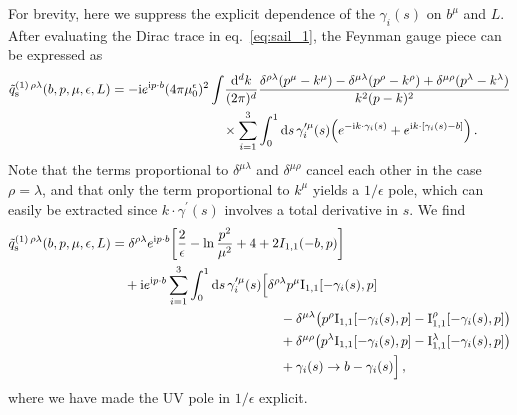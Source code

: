 \documentclass[11pt,a4paper]{article}
\DeclareRobustCommand{\eq}[1]{eq.~\eqref{eq:#1}}
\newcommand{\df}{\mathrm{d}}
\newcommand{\img}{\mathrm{i}}
\newcommand{\eps}{\epsilon}
\newcommand{\nn}{\nonumber}
\newcommand{\pb}{{p{\cdot}b}}
\newcommand{\MI}{\mathbf{\rm I}}
\begin{document}
For brevity, here we suppress the explicit dependence of the $\gamma_i(s)$ on $b^\mu$ and $L$.
After evaluating the Dirac trace in \eq{sail_1}, the Feynman gauge piece can be expressed as
\begin{align} \label{eq:sail_Feynman_2}
 \tilde q^{(1)\,\rho\lambda}_{\rm s}(b,p,\mu,\eps,L) &
 = -\img e^{\img \pb} (4\pi\mu_0^\eps)^2 \int\!\frac{\df^d k}{(2\pi)^d}
   \frac{\delta^{\rho\lambda} (p^\mu-k^\mu) - \delta^{\mu\lambda} (p^\rho-k^\rho) + \delta^{\mu\rho} (p^\lambda-k^\lambda)}{k^2 (p-k)^2}
   \nn\\&\hspace{3.cm}\times
   \sum_{i=1}^3 \int_0^1 \df s \, \gamma_i^{\prime \mu}(s) \Bigl( e^{- \img k \cdot \gamma_i(s)} + e^{\img k \cdot [\gamma_i(s) - b]} \Bigr)
\,.\end{align}
Note that the terms proportional to $\delta^{\mu\lambda}$ and $\delta^{\mu\rho}$ cancel each other in the case $\rho=\lambda$,
and that only the term proportional to $k^\mu$ yields a 
$1/\epsilon$ pole, which can easily be extracted since $k \cdot \gamma^\prime(s)$ involves
a total derivative in $s$. We find
\begin{align} \label{eq:sail_final}
 \tilde q^{(1)\,\rho\lambda}_{\rm s}(b,p,\mu,\eps,L) &
 = \delta^{\rho\lambda} e^{\img \pb} \biggl[ \frac{2}{\eps} - \ln\frac{p^2}{\mu^2} + 4 + 2 I_{1,1}(-b,p) \biggr]
 \nn\\&\quad
 + \img e^{\img \pb} \sum_{i=1}^3 \int_0^1 \df s \, \gamma_i^{\prime \mu}(s)
   \Bigl[ \delta^{\rho\lambda} p^\mu \MI_{1,1}[-\gamma_i(s), p]
        \nn\\&\hspace{4.5cm}
        - \delta^{\mu\lambda} \bigl( p^\rho \MI_{1,1}[-\gamma_i(s), p] - \MI_{1,1}^\rho[-\gamma_i(s), p] \bigr)
        \nn\\&\hspace{4.5cm}
        + \delta^{\mu\rho} \bigl( p^\lambda \MI_{1,1}[-\gamma_i(s), p] - \MI_{1,1}^\lambda[-\gamma_i(s), p] \bigr)
        \nn\\&\hspace{4.5cm}
        + \gamma_i(s) \to b - \gamma_i(s) \Bigr]
\,,\end{align}
where we have made the UV pole in $1/\eps$ explicit.
\end{document}
